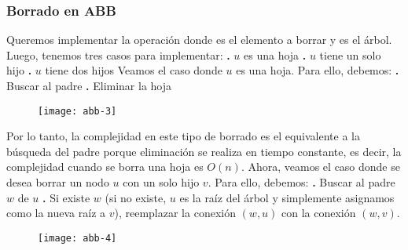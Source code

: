 \documentclass[10pt,a4paper]{article}
\begin{document}
\subsubsection{Borrado en ABB}

Queremos implementar la operación  donde  es el elemento a borrar y  es el árbol. 
\newline
\newline
Luego, tenemos tres casos para implementar:
\newline
\newline
\textbf{.} $u$ es una hoja
\newline
\newline
\textbf{.} $u$ tiene un solo hijo
\newline
\newline
\textbf{.} $u$ tiene dos hijos
\newline
\newline
Veamos el caso donde $u$ es una hoja. Para ello, debemos:
\newline
\newline
\textbf{.} Buscar al padre
\newline
\newline
\textbf{.} Eliminar la hoja

\begin{figure}[h]
	\centering
\texttt{[image: abb-3]}
	\label{drivers1}
\end{figure}

Por lo tanto, la complejidad en este tipo de borrado es el equivalente a la búsqueda del padre porque eliminación se realiza en tiempo constante, es decir, la complejidad cuando se borra una hoja es $O(n)$.
\newline
\newline
Ahora, veamos el caso donde se desea borrar un nodo $u$ con un solo hijo $v$. Para ello, debemos:
\newline
\newline
\textbf{.} Buscar al padre $w$ de $u$
\newline
\newline
\textbf{.} Si existe $w$ (si no existe, $u$ es la raíz del árbol y simplemente asignamos como la nueva raíz a $v$), reemplazar la conexión $(w,u)$ con la conexión $(w,v)$.

\begin{figure}[h]
	\centering
\texttt{[image: abb-4]}
	\label{drivers1}
\end{figure}
\newpage
\end{document}
